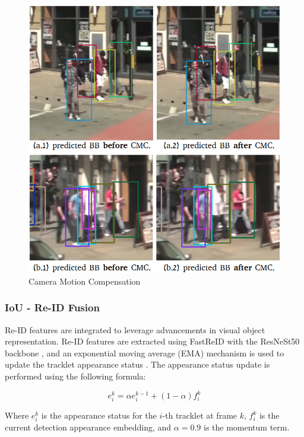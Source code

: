 \begin{figure}[H]
  \centering
  \includegraphics[scale=0.33]{gambar/cmc_pred.png}
  \caption{Camera Motion Compensation}
  \label{fig:cmc}
\end{figure}

\subsubsection{IoU - Re-ID Fusion}
\label{subsubsec:IoU - Re-ID Fusion}

Re-ID features are integrated to leverage advancements in visual object representation. Re-ID features are extracted using FastReID with the ResNeSt50 backbone \cite{he2020fastreid, zhang2020resnest}, and an exponential moving average (EMA) mechanism is used to update the tracklet appearance status \cite{wang2020towards}. The appearance status update is performed using the following formula:

\begin{equation}
e_i^k = \alpha e_i^{k-1} + (1 - \alpha) f_i^k
\end{equation}

Where $e_i^k$ is the appearance status for the $i$-th tracklet at frame $k$, $f_i^k$ is the current detection appearance embedding, and $\alpha=0.9$ is the momentum term.


